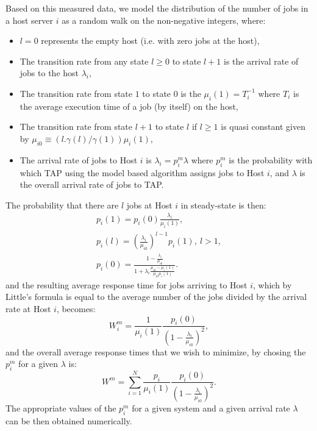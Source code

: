 \documentclass[journal]{IEEEtran}
\begin{document}
Based on this measured data, we model the distribution of the number of jobs in a host server $i$ as a random walk on the non-negative integers,
where:
\begin{itemize}
\item $l=0$ represents the empty host (i.e. with zero jobs at the host), 
\item The transition rate from any state $l\geq 0$ to state $l+1$ is the arrival rate of jobs to the host
$\lambda_i$, 
\item The transition rate from state $1$ to state $0$ is the $\mu_i(1)=T_i^{-1}$ where $T_i$ is the average execution time of a job (by itself) on the host,
\item The transition rate from state $l+1$ to state $l$ if $l\geq 1$ is quasi constant given by $\mu_{i0}\equiv (l.\gamma(l)/\gamma(1))\mu_i(1)$,
\item The arrival rate of jobs to Host $i$ is $\lambda_i=p_i^m\lambda$ where $p_i^m$ is the probability with which TAP using the model based algorithm assigns 
jobs to Host $i$, and $\lambda$ is the overall arrival rate of jobs to TAP.
\end{itemize}
The probability that there are $l$ jobs at Host $i$ in steady-state is then:
\begin{eqnarray}
p_i(1)=p_i(0)\frac{\lambda_i}{\mu_i(1)},\nonumber\\
p_i(l)=(\frac{\lambda_i}{\mu_{i0}})^{l-1}p_i(1),~l>1,\nonumber\\
p_i(0)=\frac{1-\frac{\lambda_i}{\mu_{i0}}}{1+\lambda_i\frac{\mu_{i0}-\mu_i(1)}{\mu_{i0}\mu_i(1)}}.\nonumber
\end{eqnarray}
and the resulting average response time for jobs arriving to Host $i$, which by Little's formula \cite{Gelenbe-Mitrani} is 
equal to the average number of the jobs divided by the arrival rate at Host $i$, becomes:
\begin{equation}
W_i^m=\frac{1}{\mu_i(1)}\frac{p_i(0)}{(1-\frac{\lambda_i}{\mu_{i0}})^2},
\end{equation}
and the overall average response times that we wish to minimize, by chosing the
$p_i^m$ for a given $\lambda$ is:
\begin{equation}
W^m=\sum_{i=1}^N\frac{p_i}{\mu_i(1)}\frac{p_i(0)}{(1-\frac{\lambda_i}{\mu_{i0}})^2}.
\label{eq:minavgresptime}
\end{equation}
The appropriate values of the $p_i^m$ for a given system and a given arrival rate $\lambda$ can be then obtained numerically.
\end{document}

